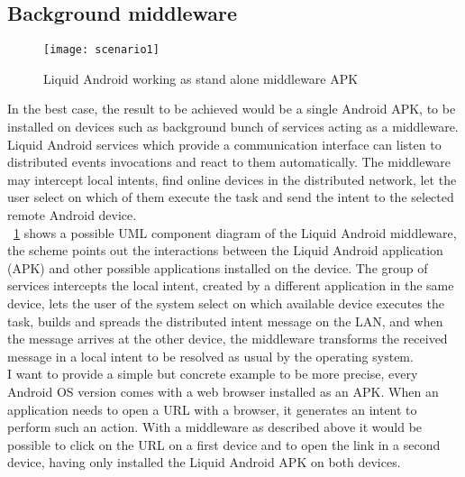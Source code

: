 \subsection{Background middleware}\label{middlewarescenario}
\begin{figure}[h!]
	\centering
	\texttt{[image: scenario1]}
	\caption{Liquid Android working as stand alone middleware APK}
	\label{fig:3.2}
\end{figure}
In the best case, the result to be achieved would be a single Android APK, to be installed on devices such as background bunch of services acting as a middleware. Liquid Android services which provide a communication interface can listen to distributed events invocations and react to them automatically. The middleware may intercept local intents, find online devices in the distributed network, let the user select on which of them execute the task and send the intent to the selected remote Android device.\\
\figurename~\ref{fig:3.2} shows a possible UML component diagram of the Liquid Android middleware, the scheme points out the interactions between the Liquid Android application (APK) and other possible applications installed on the device. The group of services intercepts the local intent, created by a different application in the same device, lets the user of the system select on which available device executes the task, builds and spreads the distributed intent message on the LAN, and when the message arrives at the other device, the middleware transforms the received message in a local intent to be resolved as usual by the operating system.\\
I want to provide a simple but concrete example to be more precise, every Android OS version comes with a web browser installed as an APK. When an application needs to open a URL with a browser, it generates an intent to perform such an action. With a middleware as described above it would be possible to click on the URL on a first device and to open the link in a second device, having only installed the Liquid Android APK on both devices.\\\\\\\\

